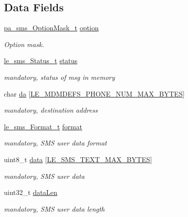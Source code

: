 \subsection*{Data Fields}
\begin{DoxyCompactItemize}
\item 
\hyperlink{pa__sms_8h_a0d21a7f97dc7168c576a14f98088eda0}{pa\+\_\+sms\+\_\+\+Option\+Mask\+\_\+t} \hyperlink{structpa__sms___sms_submit__t_aaf227da3d71e6583bd21a4eeb3899bf1}{option}
\begin{DoxyCompactList}\small\item\em Option mask. \end{DoxyCompactList}\item 
\hyperlink{le__sms__interface_8h_a18a1937acb5878ae01a9d668fe5070b6}{le\+\_\+sms\+\_\+\+Status\+\_\+t} \hyperlink{structpa__sms___sms_submit__t_aa642c8f0f829e50df4112cec04ce7a9b}{status}
\begin{DoxyCompactList}\small\item\em mandatory, status of msg in memory \end{DoxyCompactList}\item 
char \hyperlink{structpa__sms___sms_submit__t_a14b84bda8a242deab98fcd703b976d82}{da} \mbox{[}\hyperlink{le__mdm_defs__interface_8h_ae6d4a4c7892f14d1e340f8df083d479f}{L\+E\+\_\+\+M\+D\+M\+D\+E\+F\+S\+\_\+\+P\+H\+O\+N\+E\+\_\+\+N\+U\+M\+\_\+\+M\+A\+X\+\_\+\+B\+Y\+T\+ES}\mbox{]}
\begin{DoxyCompactList}\small\item\em mandatory, destination address \end{DoxyCompactList}\item 
\hyperlink{le__sms__interface_8h_a337778c44e63660c44fa2116699296c0}{le\+\_\+sms\+\_\+\+Format\+\_\+t} \hyperlink{structpa__sms___sms_submit__t_a3f2e97911a367cebb6bb91dabd596f2c}{format}
\begin{DoxyCompactList}\small\item\em mandatory, S\+MS user data format \end{DoxyCompactList}\item 
uint8\+\_\+t \hyperlink{structpa__sms___sms_submit__t_aaecd4b3b8d1bdc1032c19298403e9c36}{data} \mbox{[}\hyperlink{le__sms__interface_8h_a0dc5c2cec7c1fb166c47393fbb07e43f}{L\+E\+\_\+\+S\+M\+S\+\_\+\+T\+E\+X\+T\+\_\+\+M\+A\+X\+\_\+\+B\+Y\+T\+ES}\mbox{]}
\begin{DoxyCompactList}\small\item\em mandatory, S\+MS user data \end{DoxyCompactList}\item 
uint32\+\_\+t \hyperlink{structpa__sms___sms_submit__t_a6b85d3ecd777af094c3dc7b088fd6b8e}{data\+Len}
\begin{DoxyCompactList}\small\item\em mandatory, S\+MS user data length \end{DoxyCompactList}\end{DoxyCompactItemize}


